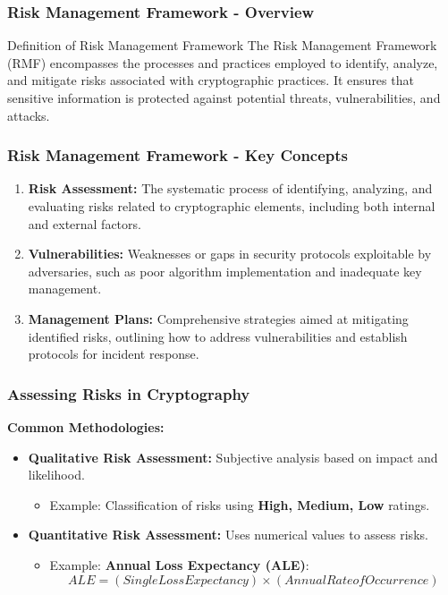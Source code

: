 \documentclass{beamer}
\begin{document}
\begin{frame}[fragile]
    \frametitle{Risk Management Framework - Overview}
    \begin{block}{Definition of Risk Management Framework}
        The Risk Management Framework (RMF) encompasses the processes and practices employed to identify, analyze, and mitigate risks associated with cryptographic practices. It ensures that sensitive information is protected against potential threats, vulnerabilities, and attacks.
    \end{block}
\end{frame}

\begin{frame}[fragile]
    \frametitle{Risk Management Framework - Key Concepts}
    \begin{enumerate}
        \item \textbf{Risk Assessment:} The systematic process of identifying, analyzing, and evaluating risks related to cryptographic elements, including both internal and external factors.
        
        \item \textbf{Vulnerabilities:} Weaknesses or gaps in security protocols exploitable by adversaries, such as poor algorithm implementation and inadequate key management.
        
        \item \textbf{Management Plans:} Comprehensive strategies aimed at mitigating identified risks, outlining how to address vulnerabilities and establish protocols for incident response.
    \end{enumerate}
\end{frame}

\begin{frame}[fragile]
    \frametitle{Assessing Risks in Cryptography}
    \textbf{Common Methodologies:}
    \begin{itemize}
        \item \textbf{Qualitative Risk Assessment:} Subjective analysis based on impact and likelihood.
        \begin{itemize}
            \item Example: Classification of risks using \textbf{High, Medium, Low} ratings.
        \end{itemize}
        
        \item \textbf{Quantitative Risk Assessment:} Uses numerical values to assess risks.
        \begin{itemize}
            \item Example: \textbf{Annual Loss Expectancy (ALE)}:
            \begin{equation}
                ALE = (Single Loss Expectancy) \times (Annual Rate of Occurrence)
            \end{equation}
        \end{itemize}
    \end{itemize}
\end{frame}
\end{document}
